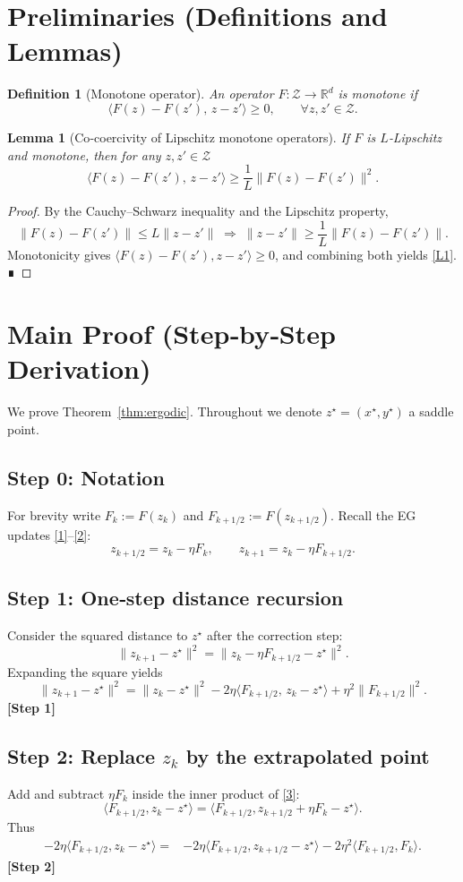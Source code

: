 \documentclass{article}
\newtheorem{lemma}{Lemma}
\newtheorem{definition}{Definition}
\newcommand{\R}{\mathbb{R}}
\begin{document}
\section*{Preliminaries (Definitions and Lemmas)}
\begin{definition}[Monotone operator]
An operator $F:\mathcal Z\to\R^{d}$ is monotone if
\[
\langle F(z)-F(z'),\,z-z'\rangle\ge 0,\qquad\forall z,z'\in\mathcal Z .
\]
\end{definition}
\begin{lemma}[Co‑coercivity of Lipschitz monotone operators]\label{lem:cocoercive}
If $F$ is $L$‑Lipschitz and monotone, then for any $z,z'\in\mathcal Z$
\[
\langle F(z)-F(z'),\,z-z'\rangle\ge \frac{1}{L}\|F(z)-F(z')\|^{2}.
\tag{L1}
\]
\end{lemma}
\begin{proof}
By the Cauchy–Schwarz inequality and the Lipschitz property,
\[
\|F(z)-F(z')\|\le L\|z-z'\|\;\Longrightarrow\;
\|z-z'\|\ge\frac{1}{L}\|F(z)-F(z')\|.
\]
Monotonicity gives $\langle F(z)-F(z'),z-z'\rangle\ge0$,
and combining both yields \eqref{L1}. ∎
\end{proof}

\section*{Main Proof (Step‑by‑Step Derivation)}
We prove Theorem~\ref{thm:ergodic}. Throughout we denote $z^{\star}=(x^{\star},y^{\star})$ a saddle point.

\subsection*{Step 0: Notation}
For brevity write $F_k:=F(z_k)$ and $F_{k+1/2}:=F(z_{k+1/2})$.
Recall the EG updates \eqref{1}–\eqref{2}:
\[
z_{k+1/2}=z_k-\eta F_k,\qquad
z_{k+1}=z_k-\eta F_{k+1/2}.
\]

\subsection*{Step 1: One‑step distance recursion}
Consider the squared distance to $z^{\star}$ after the correction step:
\[
\|z_{k+1}-z^{\star}\|^{2}
 =\|z_k-\eta F_{k+1/2}-z^{\star}\|^{2}.
\]
Expanding the square yields
\[
\|z_{k+1}-z^{\star}\|^{2}
 =\|z_k-z^{\star}\|^{2}
 -2\eta\langle F_{k+1/2},\,z_k-z^{\star}\rangle
 +\eta^{2}\|F_{k+1/2}\|^{2}. \tag{3}
\]
\textbf{[Step 1]}

\subsection*{Step 2: Replace $z_k$ by the extrapolated point}
Add and subtract $\eta F_k$ inside the inner product of \eqref{3}:
\[
\langle F_{k+1/2},z_k-z^{\star}\rangle
 =\langle F_{k+1/2},z_{k+1/2}+ \eta F_k -z^{\star}\rangle.
\]
Thus
\[
\begin{aligned}
-2\eta\langle F_{k+1/2},z_k-z^{\star}\rangle
=&-2\eta\langle F_{k+1/2},z_{k+1/2}-z^{\star}\rangle
   -2\eta^{2}\langle F_{k+1/2},F_k\rangle .
\end{aligned}
\tag{4}
\]
\textbf{[Step 2]}
\end{document}
